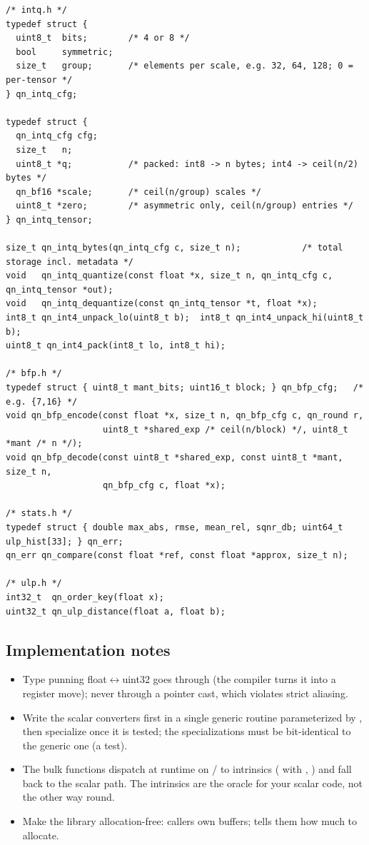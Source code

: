 \begin{lstlisting}[style=c]
/* intq.h */
typedef struct {
  uint8_t  bits;        /* 4 or 8 */
  bool     symmetric;
  size_t   group;       /* elements per scale, e.g. 32, 64, 128; 0 = per-tensor */
} qn_intq_cfg;

typedef struct {
  qn_intq_cfg cfg;
  size_t   n;
  uint8_t *q;           /* packed: int8 -> n bytes; int4 -> ceil(n/2) bytes */
  qn_bf16 *scale;       /* ceil(n/group) scales */
  uint8_t *zero;        /* asymmetric only, ceil(n/group) entries */
} qn_intq_tensor;

size_t qn_intq_bytes(qn_intq_cfg c, size_t n);            /* total storage incl. metadata */
void   qn_intq_quantize(const float *x, size_t n, qn_intq_cfg c, qn_intq_tensor *out);
void   qn_intq_dequantize(const qn_intq_tensor *t, float *x);
int8_t qn_int4_unpack_lo(uint8_t b);  int8_t qn_int4_unpack_hi(uint8_t b);
uint8_t qn_int4_pack(int8_t lo, int8_t hi);

/* bfp.h */
typedef struct { uint8_t mant_bits; uint16_t block; } qn_bfp_cfg;   /* e.g. {7,16} */
void qn_bfp_encode(const float *x, size_t n, qn_bfp_cfg c, qn_round r,
                   uint8_t *shared_exp /* ceil(n/block) */, uint8_t *mant /* n */);
void qn_bfp_decode(const uint8_t *shared_exp, const uint8_t *mant, size_t n,
                   qn_bfp_cfg c, float *x);

/* stats.h */
typedef struct { double max_abs, rmse, mean_rel, sqnr_db; uint64_t ulp_hist[33]; } qn_err;
qn_err qn_compare(const float *ref, const float *approx, size_t n);

/* ulp.h */
int32_t  qn_order_key(float x);
uint32_t qn_ulp_distance(float a, float b);
\end{lstlisting}

\subsection{Implementation notes}

\begin{itemize}
  \item Type punning float$\leftrightarrow$uint32 goes through  (the compiler turns it into a register move); never through a pointer cast, which violates strict aliasing.
  \item Write the scalar converters first in a single generic routine parameterized by , then specialize once it is tested; the specializations must be bit-identical to the generic one (a test).
  \item The bulk functions dispatch at runtime on  /  to intrinsics ( with , ) and fall back to the scalar path. The intrinsics are the oracle for your scalar code, not the other way round.
  \item Make the library allocation-free: callers own buffers;  tells them how much to allocate.
\end{itemize}

